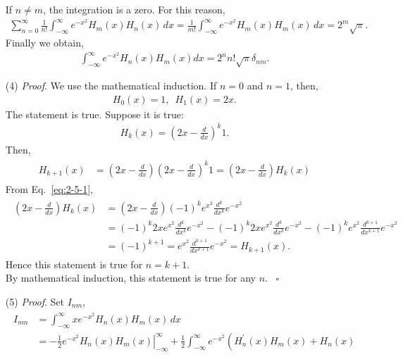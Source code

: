 \documentclass[floatfix,nofootinbib,superscriptaddress,fleqn]{revtex4-2}
\begin{document}
\begin{itemize}
If $n\neq m$, the integration is a zero. For this reason,
\begin{align}
  \sum_{n=0}^\infty\frac{1}{n!}\int_{-\infty}^{\infty}
  e^{-x^2}H_m(x)H_n(x)\,dx
  =\frac{1}{m!}\int_{-\infty}^{\infty}e^{-x^2}H_m(x)H_m(x)\,dx
  =2^m\sqrt{\pi}.
\end{align}
Finally we obtain,
\begin{align}\label{eq:2-7}
  \int_{-\infty}^\infty e^{-x^2} H_n(x) H_m(x) dx = 2^nn! \sqrt{\pi}
   \delta_{nm}.
\end{align}
\item[(4)] {\it Proof}. We use the mathematical induction. 
If $n=0$ and $n=1$, then,
\begin{align}
  H_0(x) = 1,\,\,\,H_1(x)=2x. 
\end{align}
The statement is true. Suppose it is true:
\begin{align}
  H_k(x) = \left(2x-\frac{d}{dx}\right)^k 1.
\end{align}
Then,
\begin{align}
  \begin{split}
    H_{k+1}(x) &= \left(2x-\frac{d}{dx}\right)
    \left(2x-\frac{d}{dx}\right)^k 1
    =\left(2x-\frac{d}{dx}\right)H_k(x)
  \end{split}
\end{align}
From Eq.~\eqref{eq:2-5-1},
\begin{align}
  \begin{split}
    \left(2x-\frac{d}{dx}\right)H_k(x)
    &=\left(2x-\frac{d}{dx}\right)(-1)^ke^{x^2}
    \frac{d^k}{dx^k}e^{-x^2}  \\
    &=(-1)^k 2x e^{x^2}\frac{d^k}{dx^k}e^{-x^2}
    -(-1)^k 2x e^{x^2}\frac{d^k}{dx^k}e^{-x^2}
    -(-1)^k e^{x^2}\frac{d^{k+1}}{dx^{k+1}}e^{-x^2}  \\
    &=(-1)^{k+1}= e^{x^2}\frac{d^{k+1}}{dx^{k+1}}e^{-x^2}
    =H_{k+1}(x).
  \end{split}
\end{align}
Hence this statement is true for $n=k+1$. \\
By mathematical induction, 
this statement is true for any $n$. ~\hfill $\square$
\item[(5)] {\it Proof}. Set $I_{nm}$,
\begin{align}
  \begin{split}
    I_{nm} &= \int_{-\infty}^\infty xe^{-x^2}H_n(x)H_m(x) \,dx  \\
    &=-\left.\frac{1}{2}e^{-x^2}H_n(x)H_m(x)\right|
    _{-\infty}^\infty
    +\frac{1}{2}\int_{-\infty}^\infty 
    e^{-x^2}\left(H^\prime_n(x)H_m(x)+H_n(x)

\end{split}
\end{align}
\end{itemize}
\end{document}
